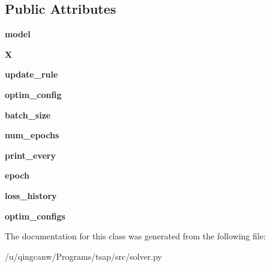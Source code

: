 \subsection*{Public Attributes}
\begin{DoxyCompactItemize}
\item 
\mbox{\label{classsrc_1_1solver_1_1Solver_a7386ec709398d24a7a80e59fd8fcb49d}} 
{\bfseries model}
\item 
\mbox{\label{classsrc_1_1solver_1_1Solver_a5bc6f71a6e206064d64be29318ea77d1}} 
{\bfseries X}
\item 
\mbox{\label{classsrc_1_1solver_1_1Solver_a0e15601942ba7729575513e5240294cb}} 
{\bfseries update\+\_\+rule}
\item 
\mbox{\label{classsrc_1_1solver_1_1Solver_a9a612f882172dcba38efc1b02d31d844}} 
{\bfseries optim\+\_\+config}
\item 
\mbox{\label{classsrc_1_1solver_1_1Solver_a973b7f2e726bf033e5cbb0807a89ec71}} 
{\bfseries batch\+\_\+size}
\item 
\mbox{\label{classsrc_1_1solver_1_1Solver_af44b53f17c981c31e74799a6d64e4fac}} 
{\bfseries num\+\_\+epochs}
\item 
\mbox{\label{classsrc_1_1solver_1_1Solver_a0769cb1d0d167e0a3aba7d8a036716f3}} 
{\bfseries print\+\_\+every}
\item 
\mbox{\label{classsrc_1_1solver_1_1Solver_a1f1e3c4c0485df56690c48684c2d0e01}} 
{\bfseries epoch}
\item 
\mbox{\label{classsrc_1_1solver_1_1Solver_a09eb5af6ea0d0f6c886bcd5772894bd7}} 
{\bfseries loss\+\_\+history}
\item 
\mbox{\label{classsrc_1_1solver_1_1Solver_a714be9061d3bef4402b7cdc77c237f0a}} 
{\bfseries optim\+\_\+configs}
\end{DoxyCompactItemize}


The documentation for this class was generated from the following file\+:\begin{DoxyCompactItemize}
\item 
/u/qingcanw/\+Programs/tsap/src/solver.\+py\end{DoxyCompactItemize}

